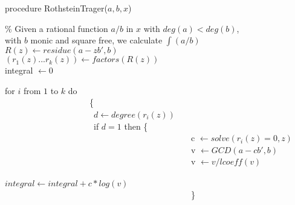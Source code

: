 \begin{flushleft}
procedure RothsteinTrager($a,b,x$)

\% Given a rational function $a/b$ in $x$ with $deg(a)<deg(b)$, \\
with $b$ monic and square free, we calculate $\int(a/b)$ \\
$R(z) \leftarrow residue(a-zb',b)$ \\
$(r_{1}(z)...r_{k}(z)) \leftarrow factors(R(z))$ \\
integral $\leftarrow 0$

for $i$ from $1$ to $k$ do \\
~~~~~~~~~~~~~~~~~~~~\{ \\
~~~~~~~~~~~~~~~~~~~~~$ d \leftarrow degree(r_{i}(z))$ \\
~~~~~~~~~~~~~~~~~~~~~if $d=1$ then \{ \\
~~~~~~~~~~~~~~~~~~~~~~~~~~~~~~~~~~~~~~~~~~~~c $\leftarrow solve(r_{i}(z)=0,z)$ \\
~~~~~~~~~~~~~~~~~~~~~~~~~~~~~~~~~~~~~~~~~~~~v $\leftarrow GCD(a-cb',b)$ \\
~~~~~~~~~~~~~~~~~~~~~~~~~~~~~~~~~~~~~~~~~~~~v $\leftarrow v/lcoeff(v)$ \\

~~~~~~~~~~~~~~~~~~~~~~~~~~~~~~~~~~~~~~~~~~~~$integral \leftarrow integral+c*log(v)$ \\
~~~~~~~~~~~~~~~~~~~~~~~~~~~~~~~~~~~~~~~~~~~~\} \\


\end{flushleft}

